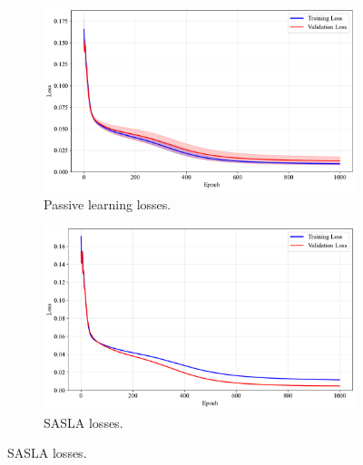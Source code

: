 \documentclass[10pt, conference]{IEEEtran}
\begin{document}
\begin{figure}[!t]
	\centering
	\caption{Losses for training of frameworks with the iris dataset.}
	\label{fig:iris-los}
	
	\begin{subfigure}{\linewidth}
		\centering
		\includegraphics[width=\linewidth]{../results/iris/losses.pdf}
		\caption{Passive learning losses.}
		\label{fig:losses}
	\end{subfigure}
	
	\vspace{0.1em}
	
	\begin{subfigure}{\linewidth}
		\centering
		\includegraphics[width=\linewidth]{../results/iris/os_losses.pdf}
		\caption{SASLA losses.}
		\label{fig:os_losses}
	\end{subfigure}
	
	\vspace{0.1em}
	

\end{figure}
\end{document}
